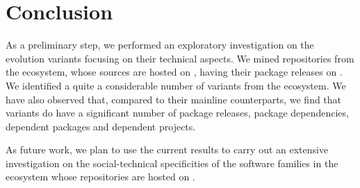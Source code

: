 \section{Conclusion}
\label{sec:conclusion}
As a preliminary step, we performed an exploratory investigation on the evolution variants focusing on their technical aspects. We mined repositories from the \js ecosystem, whose sources are hosted on \gh, having their package releases on \npm.
We identified a quite a considerable number of variants from the \js ecosystem. We have also observed that, compared to their mainline counterparts, we find that variants do have a significant number of package releases, package dependencies, dependent packages and dependent projects.

As future work, we plan to use the current results to carry out an extensive investigation on the social-technical specificities of the software families in the \js ecosystem whose repositories are hosted on \gh. 

